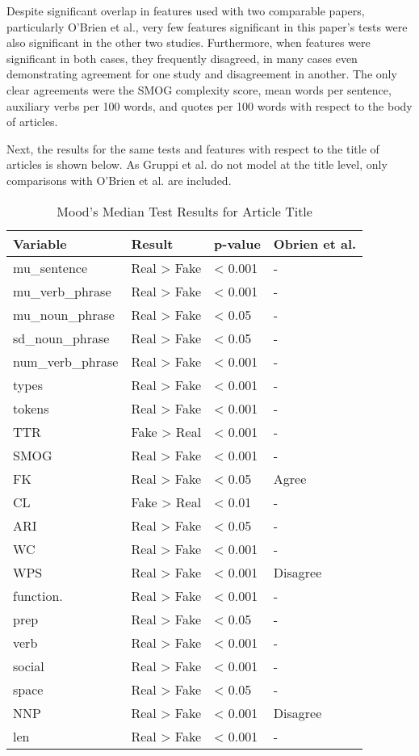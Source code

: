 \documentclass[../thesis.tex]{subfiles}
\begin{document}
Despite significant overlap in features used with two comparable papers, particularly O'Brien et al., very few features significant in this paper's tests were also significant in the other two studies. Furthermore, when features were significant in both cases, they frequently disagreed, in many cases even demonstrating agreement for one study and disagreement in another. The only clear agreements were the SMOG complexity score, mean words per sentence, auxiliary verbs per 100 words, and quotes per 100 words with respect to the body of articles.

Next, the results for the same tests and features with respect to the title of articles is shown below. As Gruppi et al. do not model at the title level, only comparisons with O'Brien et al. are included.

\begin{longtable}[t]{llll}
\caption{\label{tab:}Mood's Median Test Results for Article Title}\\
\toprule
Variable & Result & p-value & Obrien et al.\\
\midrule
mu\_sentence & Real > Fake & < 0.001 & -\\
mu\_verb\_phrase & Real > Fake & < 0.001 & -\\
mu\_noun\_phrase & Real > Fake & < 0.05 & -\\
sd\_noun\_phrase & Real > Fake & < 0.05 & -\\
num\_verb\_phrase & Real > Fake & < 0.001 & -\\
\addlinespace
types & Real > Fake & < 0.001 & -\\
tokens & Real > Fake & < 0.001 & -\\
TTR & Fake > Real & < 0.001 & -\\
SMOG & Real > Fake & < 0.001 & -\\
FK & Real > Fake & < 0.05 & Agree\\
\addlinespace
CL & Fake > Real & < 0.01 & -\\
ARI & Real > Fake & < 0.05 & -\\
WC & Real > Fake & < 0.001 & -\\
WPS & Real > Fake & < 0.001 & Disagree\\
function. & Real > Fake & < 0.001 & -\\
\addlinespace
prep & Real > Fake & < 0.05 & -\\
verb & Real > Fake & < 0.001 & -\\
social & Real > Fake & < 0.001 & -\\
space & Real > Fake & < 0.05 & -\\
NNP & Real > Fake & < 0.001 & Disagree\\
\addlinespace
len & Real > Fake & < 0.001 & -\\
\bottomrule
\end{longtable}
\end{document}
